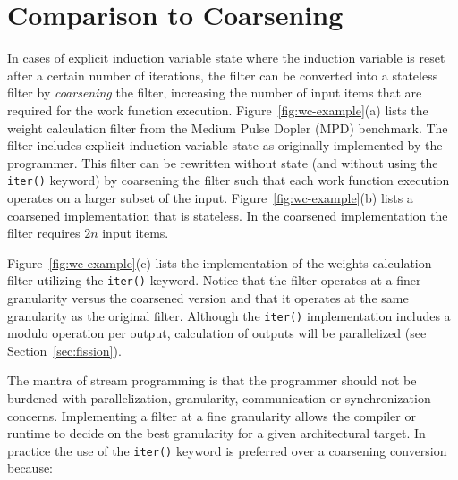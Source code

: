 \section{Comparison to Coarsening}
\label{sec:coarsen}






In cases of explicit induction variable state where the induction
variable is reset after a certain number of iterations, the filter can
be converted into a stateless filter by {\it coarsening} the filter,
increasing the number of input items that are required for the work
function execution.  Figure~\ref{fig:wc-example}(a) lists the weight
calculation filter from the Medium Pulse Dopler (MPD) benchmark.  The
filter includes explicit induction variable state as originally
implemented by the programmer.  This filter can be rewritten without
state (and without using the {\tt iter()} keyword) by coarsening the
filter such that each work function execution operates on a larger
subset of the input.  Figure~\ref{fig:wc-example}(b) lists a coarsened
implementation that is stateless.  In the coarsened implementation the
filter requires $2n$ input items.

Figure~\ref{fig:wc-example}(c) lists the implementation of the weights
calculation filter utilizing the {\tt iter()} keyword.  Notice that
the filter operates at a finer granularity versus the coarsened
version and that it operates at the same granularity as the original
filter.  Although the {\tt iter()} implementation includes a modulo
operation per output, calculation of outputs will be parallelized
(see Section~\ref{sec:fission}).

The mantra of stream programming is that the programmer should not be
burdened with parallelization, granularity, communication or
synchronization concerns.  Implementing a filter at a fine granularity
allows the compiler or runtime to decide on the best granularity for a
given architectural target.  In practice the use of the {\tt iter()}
keyword is preferred over a coarsening conversion because:

